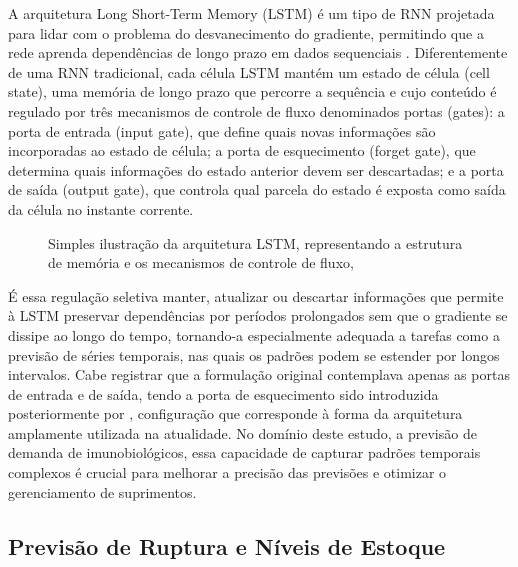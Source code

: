 \documentclass[
    12pt,                %
    openright,           %
    oneside,             %
    a4paper,             %
    english,             %
    brazil               %
]{abntex2}
\begin{document}
A arquitetura Long Short-Term Memory (LSTM) é um tipo de RNN projetada para lidar com o problema do desvanecimento do gradiente, permitindo que a rede aprenda dependências de longo prazo em dados sequenciais . Diferentemente de uma RNN tradicional, cada célula LSTM mantém um estado de célula (cell state), uma memória de longo prazo que percorre a sequência e cujo conteúdo é regulado por três mecanismos de controle de fluxo denominados portas (gates): a porta de entrada (input gate), que define quais novas informações são incorporadas ao estado de célula; a porta de esquecimento (forget gate), que determina quais informações do estado anterior devem ser descartadas; e a porta de saída (output gate), que controla qual parcela do estado é exposta como saída da célula no instante corrente.

\begin{figure}[H]
    \centering
    \caption{Simples ilustração da arquitetura LSTM, representando a estrutura de memória e os mecanismos de controle de fluxo, }
    \label{fig:lstmcell}
\end{figure}

É essa regulação seletiva manter, atualizar ou descartar informações que permite à LSTM preservar dependências por períodos prolongados sem que o gradiente se dissipe ao longo do tempo, tornando-a especialmente adequada a tarefas como a previsão de séries temporais, nas quais os padrões podem se estender por longos intervalos. Cabe registrar que a formulação original  contemplava apenas as portas de entrada e de saída, tendo a porta de esquecimento sido introduzida posteriormente por , configuração que corresponde à forma da arquitetura amplamente utilizada na atualidade. No domínio deste estudo, a previsão de demanda de imunobiológicos, essa capacidade de capturar padrões temporais complexos é crucial para melhorar a precisão das previsões e otimizar o gerenciamento de suprimentos.

\subsection{Previsão de Ruptura e Níveis de Estoque}
\label{subsec:ruptura}
\end{document}
